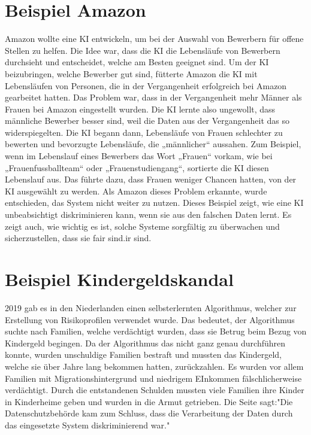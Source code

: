\documentclass{article}
\begin{document}
\section{Beispiel Amazon}
Amazon wollte eine KI entwickeln, um bei der Auswahl von Bewerbern für offene Stellen zu helfen. Die Idee war, dass die KI die Lebensläufe von Bewerbern durchsieht und entscheidet, welche am Besten geeignet sind. Um der KI beizubringen, welche Bewerber gut sind, fütterte Amazon die KI mit Lebensläufen von Personen, die in der Vergangenheit erfolgreich bei Amazon gearbeitet hatten. Das Problem war, dass in der Vergangenheit mehr Männer als Frauen bei Amazon eingestellt wurden. Die KI lernte also ungewollt, dass männliche Bewerber besser sind, weil die Daten aus der Vergangenheit das so widerspiegelten. Die KI begann dann, Lebensläufe von Frauen schlechter zu bewerten und bevorzugte Lebensläufe, die „männlicher“ aussahen. Zum Beispiel, wenn im Lebenslauf eines Bewerbers das Wort „Frauen“ vorkam, wie bei „Frauenfussballteam“ oder „Frauenstudiengang“, sortierte die KI diesen Lebenslauf aus. Das führte dazu, dass Frauen weniger Chancen hatten, von der KI ausgewählt zu werden. Als Amazon dieses Problem erkannte, wurde entschieden, das System nicht weiter zu nutzen. Dieses Beispiel zeigt, wie eine KI unbeabsichtigt diskriminieren kann, wenn sie aus den falschen Daten lernt. Es zeigt auch, wie wichtig es ist, solche Systeme sorgfältig zu überwachen und sicherzustellen, dass sie fair sind.ir sind.

\section{Beispiel Kindergeldskandal}
2019 gab es in den Niederlanden einen selbsterlernten Algorithmus, welcher zur Erstellung von Risikoprofilen verwendet wurde. Das bedeutet, der Algorithmus suchte nach Familien, welche verdächtigt wurden, dass sie Betrug beim Bezug von Kindergeld begingen. Da der Algorithmus das nicht ganz genau durchführen konnte, wurden unschuldige Familien bestraft und mussten das Kindergeld, welche sie über Jahre lang bekommen hatten, zurückzahlen. Es wurden vor allem Familien mit Migrationshintergrund und niedrigem EInkommen fälschlicherweise verdächtigt. Durch die entstandenen Schulden mussten viele Familien ihre Kinder in Kinderheime geben und wurden in die Armut getrieben. Die Seite \citep{DiskriminierendeAlgorithmen} sagt:"Die Datenschutzbehörde kam zum Schluss, dass die Verarbeitung der Daten durch das eingesetzte System diskriminierend war."
\end{document}

